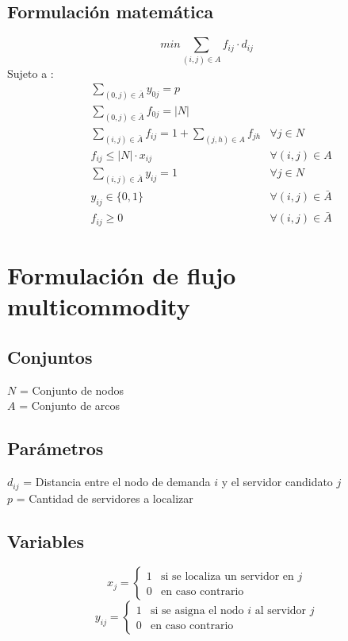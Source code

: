 \documentclass{article}
\numberwithin{equation}{section}
\begin{document}
\subsection{Formulación matemática}
\begin{equation}
min \sum_{(i,j) \in A} f_{ij} \cdot d_{ij}
\end{equation}
Sujeto a : \begin{align}
& \sum_{(0,j) \in \bar{A}} y_{0j} = p \\
& \sum_{(0,j) \in \bar{A}} f_{0j} = |N|\\
& \sum_{(i,j) \in \bar{A}} f_{ij} = 1 + \sum_{(j,h) \in A} f_{jh} &\forall j \in N \\
& f_{ij} \leq |N| \cdot x_{ij} &\forall (i,j) \in A\\
& \sum_{(i,j) \in \bar{A}} y_{ij} = 1 &\forall j \in N \\
& y_{ij} \in \{0,1\} &\forall (i,j) \in \bar{A}\\
& f_{ij} \geq 0 &\forall (i,j) \in \bar{A}
\end{align}

\newpage
\section{Formulación de flujo multicommodity}
\subsection{Conjuntos}
$N$ = Conjunto de nodos\\
$A$ = Conjunto de arcos
\subsection{Parámetros}
$d_{ij}$ = Distancia entre el nodo de demanda $i$ y el servidor candidato $j$\\
$p$ = Cantidad de servidores a localizar
\subsection{Variables}
\begin{center}
\[x_{j}={\begin{cases}1&{\mbox{si se localiza un servidor en $j$}}\\0&{\mbox{en caso contrario}}\end{cases}}
\]
\[y_{ij}={\begin{cases}1&{\mbox{si se asigna el nodo $i$ al servidor $j$}}\\0&{\mbox{en caso contrario}}\end{cases}}
\]
\end{center}
\end{document}
